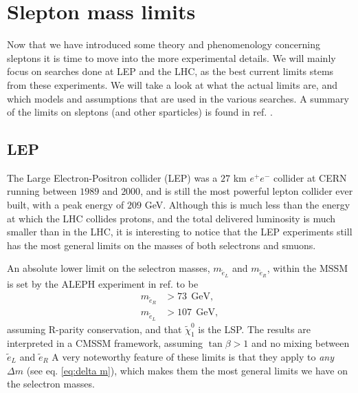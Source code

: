 \documentclass[twocolumn,a4paper,10pt]{article}
\begin{document}
\section{Slepton mass limits}

Now that we have introduced some theory and phenomenology concerning sleptons it is time to move into 
the more experimental details. We will mainly focus on searches done at LEP and the LHC, as the best 
current limits stems from these experiments. We will take a look at what the actual limits are, and 
which models and assumptions that are used in the various searches. A summary of the limits on 
sleptons (and other sparticles) is found in ref. \cite{PDG}.     

\subsection{LEP}

The Large Electron-Positron collider (LEP) was a $27$ km $e^+e^-$ collider at CERN running between 
$1989$ and $2000$, and is still the most powerful lepton collider ever built, with a peak energy of 
$209$ GeV. Although this is much less than the energy at which the LHC collides protons, and the 
total delivered luminosity is much smaller than in the LHC, it is interesting to notice that the 
LEP experiments still has the most general limits on the masses of both selectrons and smuons.  

An absolute lower limit on the selectron masses, $m_{\tilde{e}_L}$ and $m_{\tilde{e}_R}$,  within the 
MSSM is set by the ALEPH experiment in ref. \cite{ALEPH:2002} to be  
\begin{align*}
m_{\tilde{e}_R} & > 73 \:\: \text{GeV}, \\
m_{\tilde{e}_L} & > 107 \:\: \text{GeV},   
\end{align*}       
assuming R-parity conservation, and that $\tilde{\chi}_1^0$ is the LSP. The results are interpreted in 
a CMSSM framework, assuming $\tan\beta > 1$ and no mixing between $\tilde{e}_L$ and $\tilde{e}_R$ 
A very noteworthy feature of these limits is that they apply to \textit{any} $\Delta m$ (see eq. 
\ref{eq:delta m}), which makes them the most general limits we have on the selectron masses.  
\end{document}
